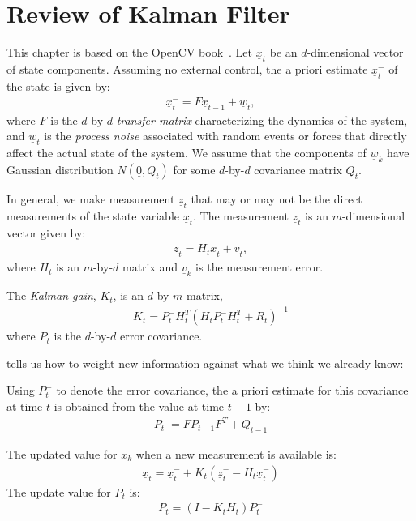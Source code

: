 \chapter{Review of Kalman Filter}\label{app:kalman}
This chapter is based on the OpenCV book~\cite{Opencv}. Let $\underline{x}_t$ be
an $d$-dimensional vector of state components. 
Assuming no external control, the a priori estimate $
\underline{x}_t^-$ of the state is
given by:
\begin{align*}
\underline{x}_t^- = F\underline{x}_{t - 1} + \underline{w}_t,
\end{align*}
where $F$ is the $d$-by-$d$ \textit{transfer matrix} characterizing the
dynamics of the system, and $\underline{w}_t$ is the \textit{process noise}
associated with random events or forces that directly affect the actual state of
the system. We assume that the components of $\underline{w}_k$ have Gaussian
distribution $N(\underline{0}, Q_t)$ for some $d$-by-$d$ covariance matrix $Q_t$.

In general, we make measurement $\underline{z}_t$ that may or may not be the
direct measurements of the state variable $\underline{x}_t$. The measurement
$\underline{z}_t$ is an $m$-dimensional vector given by:
\begin{align*}
\underline{z}_t = H_t\underline{x}_t + \underline{v}_t,
\end{align*}
where $H_t$ is an $m$-by-$d$ matrix and $\underline{v}_k$ is the measurement
error.

The \textit{Kalman gain}, $K_t$, is an $d$-by-$m$ matrix,  
\begin{align*}
K_t = P_t^-H_t^T(H_tP_t^-H_t^T + R_t)^{-1}
\end{align*}
where $P_t$ is the $d$-by-$d$ error covariance.

tells us how to
weight new information against what we think we already know:

Using $P_t^-$ to denote the error covariance, the a priori estimate for this
covariance at time $t$ is obtained from the value at time $t - 1$ by:
\begin{align*}
P_t^- = FP_{t - 1}F^T + Q_{t - 1}
\end{align*}

The updated value for $x_k$ when a new measurement is available is:
\begin{align*}
\underline{x}_t = \underline{x}_t^- + K_t(\underline{z}_t^- -
H_t\underline{x}_t^-)
\end{align*}
The update value for $P_t$ is:
\begin{align*}
P_t = (I - K_tH_t)P_t^-
\end{align*}


